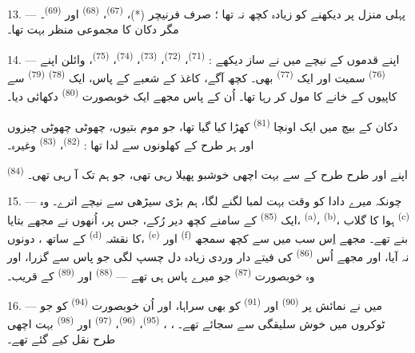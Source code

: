 13. --- پہلی منزل پر دیکھنے کو زیادہ کچھ نہ تھا ؛ صرف فرنیچر (*)،
 \textsuperscript{(67)}،  \textsuperscript{(68)} اور 
\textsuperscript{(69)}۔ مگر دکان کا مجموعی منظر بہت 
تھا۔

14. --- اپنے قدموں کے نیچے میں نے ساز دیکھے : 
\textsuperscript{(71)}،  \textsuperscript{(72)}،
 \textsuperscript{(73)}، 
\textsuperscript{(74)}،  \textsuperscript{(75)}، وائلن
اپنے  \textsuperscript{(76)} سمیت اور ایک 
\textsuperscript{(77)} بھی۔ کچھ آگے، کاغذ کے شعبے کے پاس، ایک
 \textsuperscript{(78)} 
\textsuperscript{(79)} سے کاپیوں کے خانے کا مول کر رہا تھا۔ اُن کے
پاس مجھے ایک خوبصورت  \textsuperscript{(80)} دکھائی
دیا۔

دکان کے بیچ میں ایک اونچا 
\textsuperscript{(81)} کھڑا کیا گیا تھا، جو موم بتیوں، چھوٹی چھوٹی
چیزوں اور ہر طرح کے کھلونوں سے لدا تھا : 
\textsuperscript{(82)}،  \textsuperscript{(83)} وغیرہ۔

 \textsuperscript{(84)} اپنے  اور طرح طرح کے  سے بہت اچھی خوشبو پھیلا رہی
تھی، جو ہم تک آ رہی تھی۔

\VUsaut{3.4mm}
\VUsaut{2.8mm}

15. --- چونکہ میرے دادا کو وقت بہت لمبا لگنے لگا، ہم بڑی سیڑھی سے
نیچے اترے۔ وہ ایک  \textsuperscript{(85)} کے
سامنے کچھ دیر رُکے، جس پر، اُنھوں نے مجھے بتایا،  \textsuperscript{(a)}، 
\textsuperscript{(b)}، ہوا کا گلاب 
\textsuperscript{(c)} کے ساتھ ،
دونوں  \textsuperscript{(d)} کا نقشہ،
 \textsuperscript{(e)} اور 
\textsuperscript{(f)} بنے تھے۔ مجھے اِس سب میں سے کچھ سمجھ نہ آیا، اور
مجھے اُس  \textsuperscript{(86)} کی فیتے دار
وردی زیادہ دل چسپ لگی جو پاس سے گزرا، اور وہ خوبصورت 
\textsuperscript{(87)} جو میرے پاس ہی تھے —  \textsuperscript{(88)} اور 
\textsuperscript{(89)} کے قریب۔

16. --- میں نے نمائش پر  \textsuperscript{(90)} اور
 \textsuperscript{(91)} کو بھی سراہا، اور اُن
خوبصورت  \textsuperscript{(94)} کو جو ٹوکروں میں
خوش سلیقگی سے سجائے تھے۔ ، ،
 \textsuperscript{(95)}، 
\textsuperscript{(96)}،  \textsuperscript{(97)} اور
 \textsuperscript{(98)} بہت اچھی طرح نقل کیے گئے تھے۔

